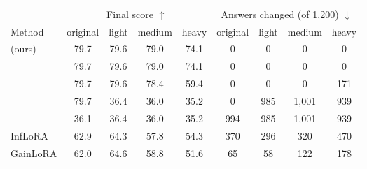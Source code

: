 \begin{tabular}{lcccccccc}
    \toprule
    & \multicolumn{4}{c}{Final score $\uparrow$} & \multicolumn{4}{c}{Answers changed (of 1{,}200) $\downarrow$} \\
    \cmidrule(lr){2-5} \cmidrule(lr){6-9}
    Method & original & light & medium & heavy & original & light & medium & heavy \\
    \midrule
    \cert{} (ours) & 79.7 & 79.6 & 79.0 & 74.1 & 0 & 0 & 0 & 0 \\
    \nearest{} & 79.7 & 79.6 & 79.0 & 74.1 & 0 & 0 & 0 & 0 \\
    \centre{} & 79.7 & 79.6 & 78.4 & 59.4 & 0 & 0 & 0 & 171 \\
    \keyswitch{} & 79.7 & 36.4 & 36.0 & 35.2 & 0 & 985 & 1{,}001 & 939 \\
    \plain{} & 36.1 & 36.4 & 36.0 & 35.2 & 994 & 985 & 1{,}001 & 939 \\
    \midrule
    InfLoRA & 62.9 & 64.3 & 57.8 & 54.3 & 370 & 296 & 320 & 470 \\
    GainLoRA & 62.0 & 64.6 & 58.8 & 51.6 & 65 & 58 & 122 & 178 \\
    \bottomrule
\end{tabular}
